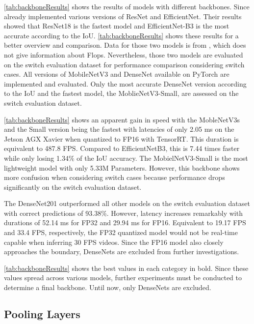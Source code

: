 \autoref{tab:backboneResults} shows the results of models with different backbones.
Since \cite{tepNet2024} already implemented various versions of ResNet and EfficientNet.
Their results showed that ResNet18 is the fastest model and EfficientNet-B3 is the most accurate according to the \ac{IoU}.
\autoref{tab:backboneResults} shows these results for a better overview and comparison.
Data for those two models is from \cite{tepNet2024}, which does not give information about Flops.
Nevertheless, those two models are evaluated on the switch evaluation dataset for performance comparison considering switch cases.
All versions of MobileNetV3 and DenseNet available on PyTorch are implemented and evaluated.
Only the most accurate DenseNet version according to the \ac{IoU} and the fastest model, the MoblieNetV3-Small, are assessed on the switch evaluation dataset.

\autoref{tab:backboneResults} shows an apparent gain in speed with the MobleNetV3s and the Small version being the fastest with latencies of only 2.05 ms on the Jetson AGX Xavier when quantized to FP16 with TensorRT.
This duration is equivalent to 487.8 \ac{FPS}.
Compared to EfficientNetB3, this is 7.44 times faster while only losing 1.34\% of the \ac{IoU} accuracy.
The MobielNetV3-Small is the most lightweight model with only 5.33M Parameters.
However, this backbone shows more confusion when considering switch cases because performance drops significantly on the switch evaluation dataset.

The DenseNet201 outperformed all other models on the switch evaluation dataset with correct predictions of 93.38\%.
However, latency increases remarkably with durations of 52.14 ms for FP32 and 29.94 ms for FP16.
Equivalent to 19.17 \ac{FPS} and 33.4 \ac{FPS}, respectively, the FP32 quantized model would not be real-time capable when inferring 30 \ac{FPS} videos.
Since the FP16 model also closely approaches the boundary, DenseNets are excluded from further investigations.

\autoref{tab:backboneResults} shows the best values in each category in bold.
Since these values spread across various models, further experiments must be conducted to determine a final backbone.
Until now, only DenseNets are excluded.

\subsection{Pooling Layers}


